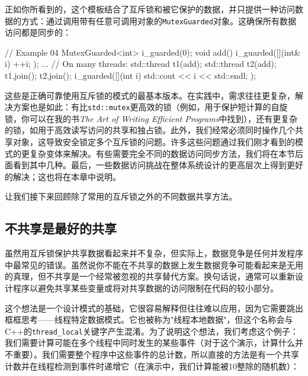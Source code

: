 正如你所看到的，这个模板结合了互斥锁和被它保护的数据，并只提供一种访问数据的方式：通过调用带有任意可调用对象的\texttt{MutexGuarded}对象。这确保所有数据访问都是同步的：

\begin{code}
// Example 04
MutexGuarded<int> i_guarded(0);
void add() {
  i_guarded([](int& i) { ++i; });
}
...
// On many threads:
std::thread t1(add);
std::thread t2(add);
t1.join();
t2.join();
i_guarded([](int i) { std::cout << i << std::endl; });
\end{code}

这些是正确可靠使用互斥锁的模式的最基本版本。在实践中，需求往往更复杂，解决方案也是如此：有比\texttt{std::mutex}更高效的锁（例如，用于保护短计算的自旋锁，你可以在我的书\emph{The Art of Writing Efficient Programs}中找到），还有更复杂的锁，如用于高效读写访问的共享和独占锁。此外，我们经常必须同时操作几个共享对象，这导致安全锁定多个互斥锁的问题。许多这些问题通过我们刚才看到的模式的更复杂变体来解决。有些需要完全不同的数据访问同步方法，我们将在本节后面看到其中几种。最后，一些数据访问挑战在整体系统设计的更高层次上得到更好的解决；这也将在本章中说明。

让我们接下来回顾除了常用的互斥锁之外的不同数据共享方法。

\subsection{不共享是最好的共享}

虽然用互斥锁保护共享数据看起来并不复杂，但实际上，数据竞争是任何并发程序中最常见的错误。虽然说你不能在不共享的数据上发生数据竞争可能看起来是无用的真理，但不共享是一个经常被忽视的共享替代方案。换句话说，通常可以重新设计程序以避免共享某些变量或将对共享数据的访问限制在代码的较小部分。

这个想法是一个设计模式的基础，它很容易解释但往往难以应用，因为它需要跳出框框思考——线程特定数据模式。它也被称为"线程本地数据"，但这个名称会与C++的\texttt{thread\_local}关键字产生混淆。为了说明这个想法，我们考虑这个例子：我们需要计算可能在多个线程中同时发生的某些事件（对于这个演示，计算什么并不重要）。我们需要整个程序中这些事件的总计数，所以直接的方法是有一个共享计数并在线程检测到事件时递增它（在演示中，我们计算能被10整除的随机数）：


